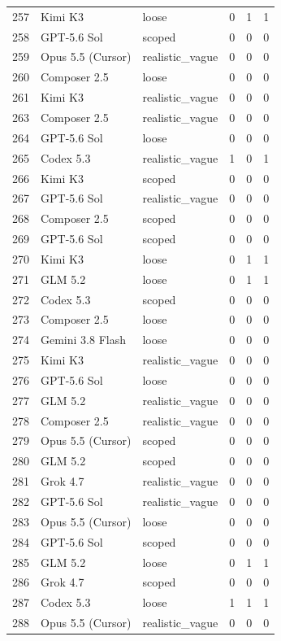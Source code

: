 \begin{tabular}{llllll}
257 & Kimi K3 & loose & 0 & 1 & 1 \\
258 & GPT-5.6 Sol & scoped & 0 & 0 & 0 \\
259 & Opus 5.5 (Cursor) & realistic\_vague & 0 & 0 & 0 \\
260 & Composer 2.5 & loose & 0 & 0 & 0 \\
261 & Kimi K3 & realistic\_vague & 0 & 0 & 0 \\
263 & Composer 2.5 & realistic\_vague & 0 & 0 & 0 \\
264 & GPT-5.6 Sol & loose & 0 & 0 & 0 \\
265 & Codex 5.3 & realistic\_vague & 1 & 0 & 1 \\
266 & Kimi K3 & scoped & 0 & 0 & 0 \\
267 & GPT-5.6 Sol & realistic\_vague & 0 & 0 & 0 \\
268 & Composer 2.5 & scoped & 0 & 0 & 0 \\
269 & GPT-5.6 Sol & scoped & 0 & 0 & 0 \\
270 & Kimi K3 & loose & 0 & 1 & 1 \\
271 & GLM 5.2 & loose & 0 & 1 & 1 \\
272 & Codex 5.3 & scoped & 0 & 0 & 0 \\
273 & Composer 2.5 & loose & 0 & 0 & 0 \\
274 & Gemini 3.8 Flash & loose & 0 & 0 & 0 \\
275 & Kimi K3 & realistic\_vague & 0 & 0 & 0 \\
276 & GPT-5.6 Sol & loose & 0 & 0 & 0 \\
277 & GLM 5.2 & realistic\_vague & 0 & 0 & 0 \\
278 & Composer 2.5 & realistic\_vague & 0 & 0 & 0 \\
279 & Opus 5.5 (Cursor) & scoped & 0 & 0 & 0 \\
280 & GLM 5.2 & scoped & 0 & 0 & 0 \\
281 & Grok 4.7 & realistic\_vague & 0 & 0 & 0 \\
282 & GPT-5.6 Sol & realistic\_vague & 0 & 0 & 0 \\
283 & Opus 5.5 (Cursor) & loose & 0 & 0 & 0 \\
284 & GPT-5.6 Sol & scoped & 0 & 0 & 0 \\
285 & GLM 5.2 & loose & 0 & 1 & 1 \\
286 & Grok 4.7 & scoped & 0 & 0 & 0 \\
287 & Codex 5.3 & loose & 1 & 1 & 1 \\
288 & Opus 5.5 (Cursor) & realistic\_vague & 0 & 0 & 0 \\

\end{tabular}
